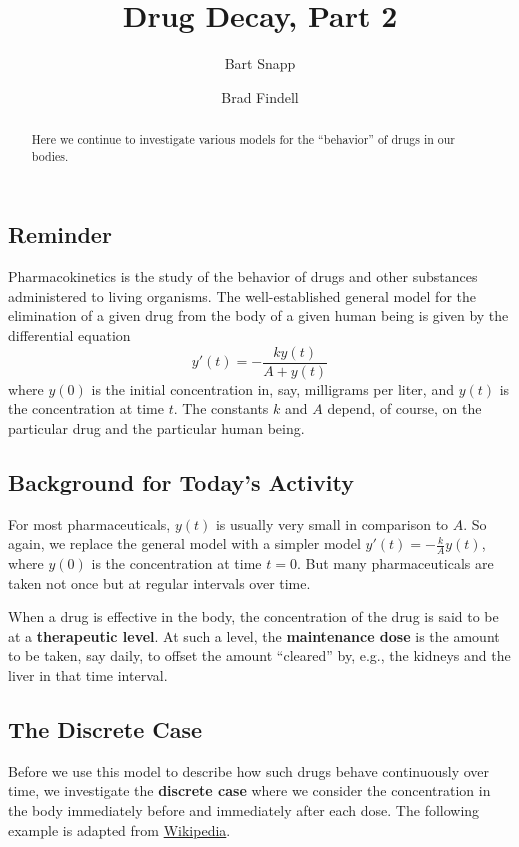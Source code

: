 \documentclass{ximera}
\title{Drug Decay, Part 2}
\author{Bart Snapp \and Brad Findell}
\begin{document}
\begin{abstract}
Here we continue to investigate various models for the ``behavior'' of drugs in our bodies.  
\end{abstract}
\maketitle

\subsection{Reminder}
Pharmacokinetics is the study of the behavior of drugs and other substances administered to living organisms.  
The well-established general model for 
the elimination of a given drug from the body of a given human being is given by the differential equation 
$$y'(t)=-\frac{ky(t)}{A+y(t)}$$
where $y(0)$ is the initial concentration in, say, milligrams per liter, and $y(t)$ is the concentration at time $t$.  The constants $k$ and $A$ depend, of course, on the particular drug and the particular human being. 


\subsection{Background for Today's Activity}
For most pharmaceuticals, $y(t)$ is usually very small in comparison
to $A$.  So again, we replace the general model with a simpler model
$y'(t)=-\frac{k}{A}y(t)$, where $y(0)$ is the concentration at time
$t=0$.  But many pharmaceuticals are taken not once but at regular
intervals over time.

When a drug is effective in the body, the concentration of the drug is
said to be at a \textbf{therapeutic level}.  At such a level, the
\textbf{maintenance dose} is the amount to be taken, say daily, to
offset the amount ``cleared'' by, e.g., the kidneys and the liver in
that time interval.

\subsection{The Discrete Case}
Before we use this model to describe how such drugs behave
continuously over time, we investigate the \textbf{discrete case}
where we consider the concentration in the body immediately before and
immediately after each dose.  The following example is adapted from
\href{http://en.wikipedia.org/wiki/Loading_dose}{Wikipedia}.
\end{document}
